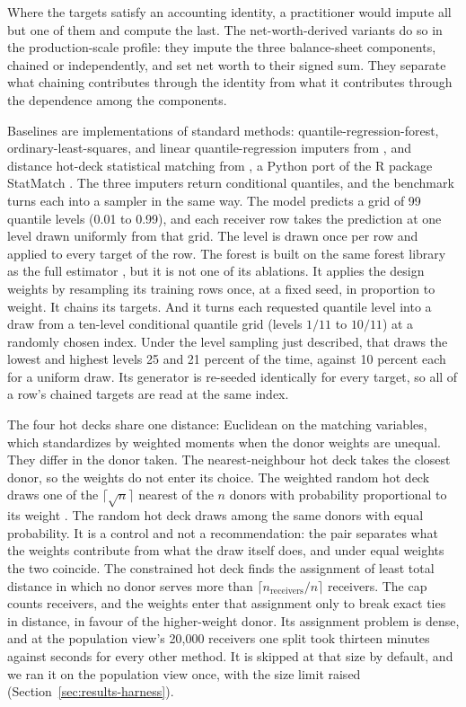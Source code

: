 Where the targets satisfy an accounting identity, a practitioner would impute
all but one of them and compute the last. The net-worth-derived variants do
so in the production-scale profile: they impute the three balance-sheet
components, chained or independently, and set net worth to their signed sum.
They separate what chaining contributes through the identity from what it
contributes through the dependence among the components.

Baselines are implementations of standard methods:
quantile-regression-forest, ordinary-least-squares, and
linear quantile-regression imputers from \microimpute{}
\citep{policyengine2025microimpute}, and distance hot-deck
statistical matching from \pystatmatch{}, a Python port of the R package StatMatch
\citep{dorazio2025statmatch}. The three \microimpute{} imputers return
conditional quantiles, and the benchmark turns each into a sampler in the
same way. The model predicts a grid of 99 quantile levels (0.01 to 0.99),
and each receiver row takes the prediction at one level drawn uniformly
from that grid. The level is drawn once per row and applied to every target
of the row. The \microimpute{} forest is built on the same
forest library as the full estimator \citep{johnson2024quantile}, but it is
not one of its ablations. It applies the design weights by resampling its
training rows once, at a fixed seed, in proportion to weight. It chains its
targets. And it turns each requested quantile level into a draw from a
ten-level conditional quantile grid (levels $1/11$ to $10/11$) at a randomly
chosen index. Under the level sampling just described, that draws
the lowest and highest levels 25 and 21 percent of the time, against 10
percent each for a uniform draw. Its generator is re-seeded identically for
every target, so all of a row's chained targets are read at the same index.

The four hot decks share one distance: Euclidean on the matching variables,
which \pystatmatch{} standardizes by weighted moments when the donor weights
are unequal. They differ in the donor taken. The nearest-neighbour hot deck
takes the closest donor, so the weights do not enter its choice. The weighted
random hot deck draws one of the $\lceil\sqrt{n}\rceil$ nearest of the $n$
donors with probability proportional to its weight
\citep{dorazio2006statistical}. The random hot deck draws among the same
donors with equal probability. It is a control and not a recommendation:
the pair separates what the weights contribute from what the draw itself
does, and under equal weights the two coincide. The constrained hot deck finds the assignment
of least total distance in which no donor serves more than
$\lceil n_{\text{receivers}} / n \rceil$ receivers. The cap counts receivers,
and the weights enter that assignment only to break exact ties in distance,
in favour of the higher-weight donor. Its assignment problem is dense, and at the
population view's 20,000 receivers one split took thirteen minutes against
seconds for every other method. It is skipped at that size by default, and
we ran it on the population view once, with the size limit raised
(Section~\ref{sec:results-harness}).

